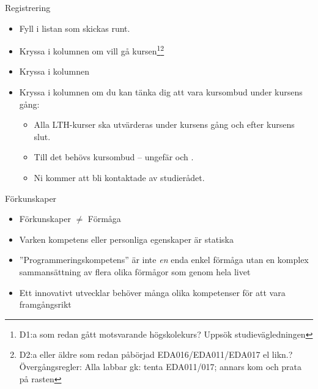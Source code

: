 \begin{Slide}{Registrering}
\begin{itemize}
\item Fyll i listan  som skickas runt.

\item Kryssa i kolumnen  om vill gå kursen\footnote{\scriptsize D1:a som redan gått motsvarande högskolekurs? Uppsök studievägledningen}\footnote{\scriptsize D2:a eller äldre som redan påbörjad EDA016/EDA011/EDA017 el likn.? Övergångsregler: Alla labbar gk: tenta EDA011/017; annars kom och prata på rasten}

\item Kryssa i kolumnen 

\item Kryssa i kolumnen  om du kan tänka dig att vara kursombud under kursens gång:
\begin{itemize}
\item Alla LTH-kurser ska utvärderas under kursens gång och efter kursens slut.
\item Till det behövs kursombud -- ungefär  och .
\item Ni kommer att bli kontaktade av studierådet.
\end{itemize}
\end{itemize}
\end{Slide}

\fi


\begin{Slide}{Förkunskaper}
\begin{itemize}
\item Förkunskaper $\neq$ Förmåga
\item Varken kompetens eller personliga egenskaper är statiska
\item ''Programmeringskompetens'' är inte \textit{en} enda enkel förmåga utan en komplex sammansättning av flera olika förmågor som  genom hela livet
\item Ett innovativt utvecklar behöver många olika kompetenser för att vara framgångsrikt
\end{itemize}
\end{Slide}

\ifkompendium\else

